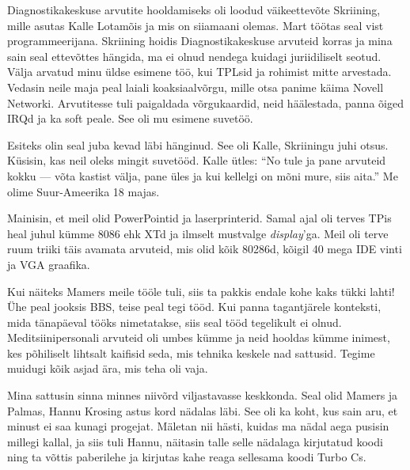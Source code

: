 
Diagnostikakeskuse arvutite hooldamiseks oli loodud väikeettevõte 
Skriining, mille asutas Kalle 
Lotamõis ja mis on siiamaani olemas. Mart töötas seal vist programmeerijana.
Skriining hoidis Diagnostikakeskuse arvuteid korras ja mina sain seal ettevõttes
hängida, ma ei olnud nendega kuidagi juriidiliselt seotud. 
Välja arvatud minu üldse esimene töö, kui TPLsid ja rohimist mitte arvestada. Vedasin neile maja peal laiali koaksiaalvõrgu, mille otsa panime käima 
Novell Networki. Arvutitesse tuli paigaldada võrgukaardid, neid häälestada, panna 
õiged IRQd ja ka soft peale. See oli mu 
esimene suvetöö.


Esiteks olin seal juba kevad läbi hänginud. See oli 
Kalle, Skriiningu juhi otsus. 
Küsisin, kas neil oleks mingit suvetööd. Kalle ütles: \enquote{No tule ja pane 
arvuteid kokku --- võta kastist välja, pane üles ja kui kellelgi on 
mõni mure, siis aita.} Me olime Suur-Ameerika 18 majas. 

Mainisin, et meil olid PowerPointid ja laserprinterid. Samal ajal oli terves TPis heal 
juhul kümme 8086 ehk XTd ja ilmselt mustvalge 
\emph{display}'ga. Meil oli terve ruum triiki täis 
avamata arvuteid, mis olid kõik 80286d, kõigil 40 mega IDE vinti ja VGA 
graafika. 

Kui näiteks Mamers meile tööle tuli, 
siis ta pakkis endale kohe kaks tükki lahti! Ühe peal jooksis BBS, teise 
peal tegi tööd. Kui panna 
tagantjärele konteksti, mida tänapäeval tööks nimetatakse, siis seal tööd 
tegelikult ei olnud. Meditsiinipersonali arvuteid oli 
umbes kümme ja neid hooldas kümme inimest, kes põhiliselt 
lihtsalt kaifisid seda, mis tehnika keskele nad sattusid. Tegime 
muidugi kõik asjad ära, mis teha oli vaja. 

Mina sattusin sinna minnes niivõrd viljastavasse keskkonda. Seal 
olid Mamers ja Palmas, 
Hannu Krosing astus kord nädalas läbi. See oli ka 
koht, kus sain aru, et minust ei saa kunagi progejat. Mäletan nii 
hästi, kuidas ma nädal aega pusisin millegi kallal, ja siis tuli Hannu, näitasin 
talle selle nädalaga kirjutatud koodi ning ta võttis paberilehe ja 
kirjutas kahe reaga sellesama koodi Turbo Cs.

